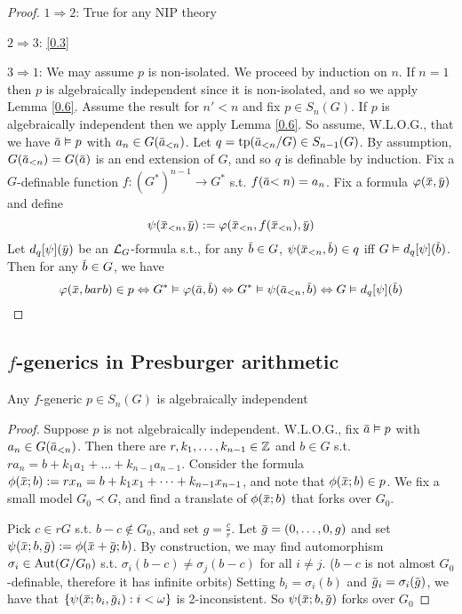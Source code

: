 \documentclass[11pt]{article}
\begin{document}
\begin{proof}
\(1\Rightarrow 2\): True for any NIP theory

\(2\Rightarrow 3\): \ref{0.3}

\(3\Rightarrow 1\): We may assume \(p\) is non-isolated. We proceed by induction on \(n\). If \(n=1\)
then \(p\) is algebraically independent since it is non-isolated, and so we apply Lemma \ref{0.6}.
Assume the result for \(n'<n\) and fix \(p\in S_n(G)\). If \(p\) is algebraically independent then
we apply Lemma \ref{0.6}. So assume, W.L.O.G., that we have \(\bara\vDash p\)
with \(a_n\in G(\bara_{<n})\). Let \(q=\tp(\bara_{<n}/G)\in S_{n-1}(G)\). By
assumption, \(G(\bara_{<n})=G(\bara)\) is an end extension of \(G\), and so \(q\) is definable
by induction. Fix a \(G\)-definable function \(f:(G^*)^{n-1}\to G^*\) s.t. \(f(\bara{<n})=a_n\).
Fix a formula \(\varphi(\barx,\bary)\) and define
\begin{equation*}
\psi(\barx_{<n},\bary):=\varphi(\barx_{<n},f(\barx_{<n}),\bary)
\end{equation*}
Let \(d_q[\psi](\bary)\) be an \(\mathcal{L}_G\)-formula s.t., for
any \(\barb\in G\), \(\psi(\barx_{<n},\barb)\in q\) iff \(G\vDash d_q[\psi](\barb)\). Then for
any \(\barb\in G\), we have
\begin{equation*}
\varphi(\barx,barb)\in p\Leftrightarrow G^*\vDash\varphi(\bara,\barb)\Leftrightarrow G^*\vDash\psi(\bara_{<n},\barb)\Leftrightarrow
G\vDash d_q[\psi](\barb)
\end{equation*}
\end{proof}
\subsection{\texorpdfstring{\(f\)}{f}-generics in Presburger arithmetic}
\label{sec:org12c6755}
\begin{proposition}[]
Any \(f\)-generic \(p\in S_n(G)\) is algebraically independent
\end{proposition}

\begin{proof}
Suppose \(p\) is not algebraically independent. W.L.O.G., fix \(\bara\vDash p\)
with \(a_n\in G(\bara_{<n})\). Then there are \(r,k_1,\dots,k_{n-1}\in\mathbb{Z}\) and \(b\in G\)
s.t. \(ra_n=b+k_1a_1+\dots+k_{n-1}a_{n-1}\). Consider the
formula \(\phi(\barx;b):=rx_n=b+k_1x_1+\dots+k_{n-1}x_{n-1}\), and note that \(\phi(\barx;b)\in p\). We fix a
small model \(G_0\prec G\), and find a translate of \(\phi(\barx;b)\) that forks over \(G_0\).

Pick \(c\in rG\) s.t. \(b-c\notin G_0\), and set \(g=\frac{c}{r}\). Let \(\barg=(0,\dots,0,g)\) and
set \(\psi(\barx;b,\barg):=\phi(\barx+\barg;b)\). By construction, we may find
automorphism \(\sigma_i\in\operatorname{\text{Aut}}(G/G_0)\) s.t. \(\sigma_i(b-c)\neq\sigma_j(b-c)\) for all \(i\neq j\). (\(b-c\) is
not almost \(G_0\)-definable, therefore it has infinite orbits)
Setting \(b_i=\sigma_i(b)\) and \(\barg_i=\sigma_i(\barg)\), we have that \(\{\psi(\barx;b_i,\barg_i):i<\omega\}\) is
2-inconsistent. So \(\psi(\barx;b,\barg)\) forks over \(G_0\)
\end{proof}
\end{document}
